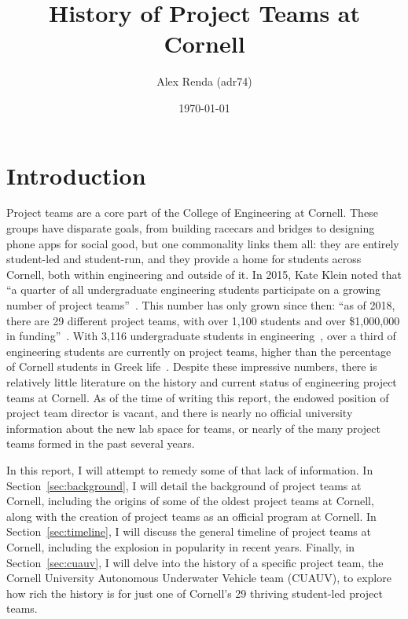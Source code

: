 \documentclass[12pt]{article}
\title{History of Project Teams at Cornell}
\author{Alex Renda (adr74)}
\date{\monthyeardate\today}
\begin{document}
\maketitle

\doublespacing

\section{Introduction}

Project teams are a core part of the College of Engineering at Cornell.
These groups have disparate goals, from building racecars and bridges to designing phone apps for social good, but one commonality links them all: they are entirely student-led and student-run, and they provide a home for students across Cornell, both within engineering and outside of it.
In 2015, Kate Klein noted that ``a quarter of all undergraduate engineering students participate on a growing number of project teams''~\cite{klein_engineering_2015}.
This number has only grown since then:
``as of 2018, there are 29 different project teams, with over 1,100 students and over \$1,000,000 in funding''~\cite{noauthor_project_2018}.
With 3,116 undergraduate students in engineering~\cite{westervelt_key_2017}, over a third of engineering students are currently on project teams, higher than the percentage of Cornell students in Greek life~\cite{noauthor_sorority_2017}.
Despite these impressive numbers, there is relatively little literature on the history and current status of engineering project teams at Cornell.
As of the time of writing this report, the endowed position of project team director is vacant, and there is nearly no official university information about the new lab space for teams, or nearly of the many project teams formed in the past several years.

In this report, I will attempt to remedy some of that lack of information.
In Section~\ref{sec:background}, I will detail the background of project teams at Cornell, including the origins of some of the oldest project teams at Cornell, along with the creation of project teams as an official program at Cornell.
In Section~\ref{sec:timeline}, I will discuss the general timeline of project teams at Cornell, including the explosion in popularity in recent years.
Finally, in Section~\ref{sec:cuauv}, I will delve into the history of a specific project team, the Cornell University Autonomous Underwater Vehicle team (CUAUV), to explore how rich the history is for just one of Cornell's 29 thriving student-led project teams.
\end{document}

